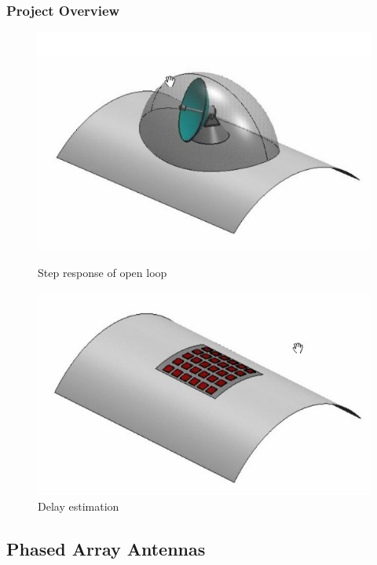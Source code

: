\documentclass{beamer}
\begin{document}
\begin{frame}\frametitle{Project Overview}
	\begin{figure}[H]
		\begin{minipage}[t]{0.45\textwidth}
			\centering
			\includegraphics[width=\linewidth]{images/past_antenna1}
			\caption{Step response of open loop}
			\label{fig:bandwidth1}
		\end{minipage}
			\hspace{\fill}
		\begin{minipage}[t]{0.45\textwidth}
			\centering
			\includegraphics[width=\linewidth]{images/paa_1}
			\caption{Delay estimation}
			\label{fig:bandwidth2}
		\end{minipage}
	\end{figure}
\end{frame}

\subsection{Phased Array Antennas}
\end{document}
